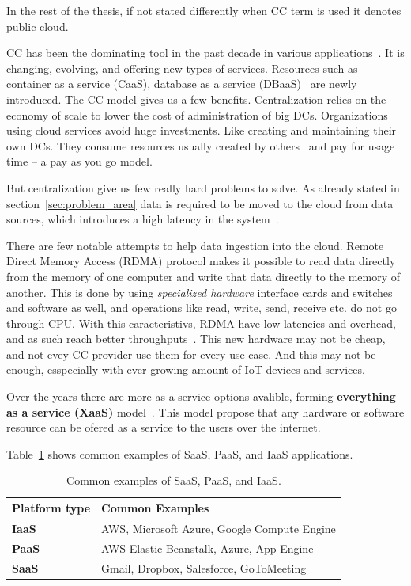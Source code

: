 In the rest of the thesis, if not stated differently when CC term is used it denotes public cloud.

CC has been the dominating tool in the past decade in various applications~\cite{Satyanarayanan17}. It is changing, evolving, and offering new types of services. Resources such as container as a service (CaaS), database as a service (DBaaS)~\cite{Peter} are newly introduced. The CC model gives us a few benefits. Centralization relies on the economy of scale to lower the cost of administration of big DCs. Organizations using cloud services avoid huge investments. Like creating and maintaining their own DCs. They consume resources usually created by others~\cite{Satyanarayanan17} and pay for usage time -- a pay as you go model. 

But centralization give us few really hard problems to solve. As already stated in section~\ref{sec:problem_area} data is required to be moved to the cloud from data sources, which introduces a high latency in the system~\cite{HossainRH18}. 

There are few notable attempts to help data ingestion into the cloud. Remote Direct Memory Access (RDMA) protocol makes it possible to read data directly from the memory of one computer and write that data directly to the memory of another. This is done by using \textit{specialized hardware} interface cards and switches and software as well, and operations like read, write, send, receive etc. do not go through CPU. With this caracteristivs, RDMA have low latencies and overhead, and as such reach better throughputs~\cite{CohenTKCKRCDG09}. This new hardware may not be cheap, and not evey CC provider use them for every use-case. And this may not be enough, esspecially with ever growing amount of IoT devices and services.

Over the years there are more as a service options avalible, forming \textbf{everything as a service (XaaS)} model~\cite{DuanFZSNH15}. This model propose that any hardware or software resource can be ofered as a service to the users over the internet.

Table~\ref{tab:table2} shows common examples of SaaS, PaaS, and IaaS applications.

\begin{table}[h!]
	\begin{center}
		\begin{tabular}{l|l}
			\textbf{Platform type} & \textbf{Common Examples}\\
			\hline
			\textbf{IaaS} & AWS, Microsoft Azure, Google Compute Engine \\
			\textbf{PaaS} & AWS Elastic Beanstalk, Azure, App Engine \\
			\textbf{SaaS} & Gmail, Dropbox, Salesforce, GoToMeeting \\
		\end{tabular}
	\end{center}
	\vspace{-0.5cm}
	\caption{Common examples of SaaS, PaaS, and IaaS.}
	\label{tab:table2}
\end{table}

